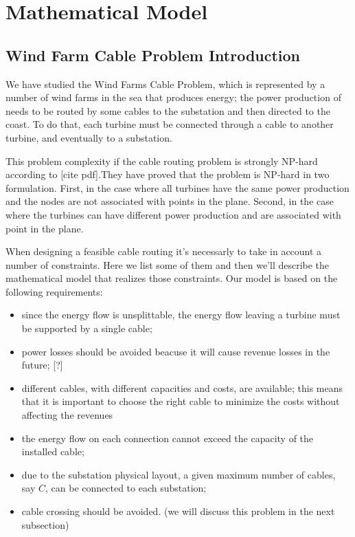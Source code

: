 
\chapter{Mathematical Model}
\label{chp:2-Model}

\section{Wind Farm Cable Problem Introduction}
We have studied the Wind Farms Cable Problem, which is represented by a number of wind farms in the sea that produces energy; the power production of needs to be routed by some cables to the substation and then directed to the coast.
To do that, each turbine must be connected through a cable to another turbine, and eventually to a substation.

This problem complexity if the cable routing problem is strongly NP-hard according to [cite pdf].They have proved that the problem is NP-hard in two formulation. First, in the case where all turbines have the same power production and the nodes are not associated with points in the plane. Second, in the case where the turbines can have different power production and are associated with point in the plane. 

When designing a feasible cable routing it's necessarly to take in account a number of constraints. Here we list some of them and then we'll describe the mathematical model that realizes those constraints. Our model is based on the following requirements:

\begin{itemize}
\item since the energy flow is unsplittable, the energy flow leaving a turbine must be supported by a single cable; 
\item power losses should be avoided beacuse it will cause revenue losses in the future; [?]
\item different cables, with different capacities and costs, are available; this means that it is important to choose the right cable to minimize the costs without affecting the revenues 
\item the energy flow on each connection cannot exceed the capacity of the installed cable;
\item due to the substation physical layout, a given maximum number of cables, say $C$, can be connected to each substation; 
\item cable crossing should be avoided. (we will discuss this problem in the next subsection)
\end{itemize}

